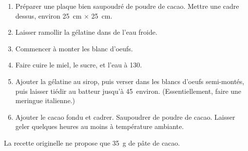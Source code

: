 
\begin{ingredients}
\end{ingredients}


\begin{recipe}
  \begin{enumerate}

  \item Préparer une plaque bien saupoudré de poudre de cacao. Mettre
    une cadre dessus, environ 25~cm$\,\times\,$25~cm.

  \item Laisser ramollir la gélatine dans de l'eau froide.

  \item Commencer à monter les blanc d'oeufs.

  \item Faire cuire le miel, le sucre, et l'eau à 130\degreeC.

  \item Ajouter la gélatine au sirop, puis verser dans les blancs
    d'oeufs semi-montés, puis laisser tiédir au batteur jusqu'à 45\degreeC\,
    environ. (Essentiellement, faire une meringue italienne.)

  \item Ajouter le cacao fondu et cadrer. Saupoudrer de poudre de
    cacao. Laisser geler quelques heures au moins à température
    ambiante.

  \end{enumerate}
\end{recipe}

La recette originelle ne propose que 35~g de pâte de cacao.


